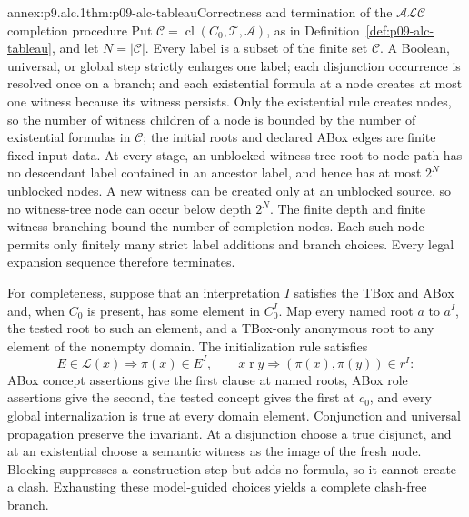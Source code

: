 
\begin{annexitem}{annex:p9.alc.1}{thm:p09-alc-tableau}{Correctness and termination of the \(\mathcal{ALC}\) completion procedure}
Put
\(\mathcal C=\operatorname{cl}(C_0,\mathcal T,\mathcal A)\), as in
Definition~\ref{def:p09-alc-tableau}, and let \(N=|\mathcal C|\).  Every label
is a subset of the finite set \(\mathcal C\).  A Boolean, universal, or global
step strictly enlarges one label; each disjunction occurrence is resolved once
on a branch; and each existential formula at a node creates at most one
witness because its witness persists.  Only the existential rule creates
nodes, so the number of witness children of a node is bounded by the number of
existential formulas in \(\mathcal C\); the initial roots and declared ABox
edges are finite fixed input data.  At every stage, an unblocked
witness-tree root-to-node path has no descendant label contained in an
ancestor label, and hence has at most \(2^N\) unblocked nodes.  A new witness
can be created only at an unblocked source, so no witness-tree node can occur
below depth \(2^N\).  The finite depth and finite witness branching bound the
number of completion nodes.  Each such node permits only finitely many strict
label additions and branch choices.  Every legal expansion sequence therefore
terminates.

For completeness, suppose that an interpretation \(I\) satisfies the TBox and
ABox and, when \(C_0\) is present, has some element in \(C_0^I\).  Map every
named root \(a\) to \(a^I\), the tested root to such an element, and a
TBox-only anonymous root to
any element of the nonempty domain.  The initialization rule satisfies
\[
 E\in\mathcal L(x)\Longrightarrow\pi(x)\in E^I,
 \qquad
 x\mathrel r y\Longrightarrow(\pi(x),\pi(y))\in r^I:
\]
ABox concept assertions give the first clause at named roots, ABox role
assertions give the second, the tested concept gives the first at \(c_0\), and
every global internalization is true at every domain element.  Conjunction and
universal propagation preserve the invariant.  At a disjunction choose a true
disjunct, and at an existential choose a semantic witness as the image of the
fresh node.  Blocking suppresses a construction step but adds no formula, so
it cannot create a clash.  Exhausting these model-guided choices yields a
complete clash-free branch.


\end{annexitem}
